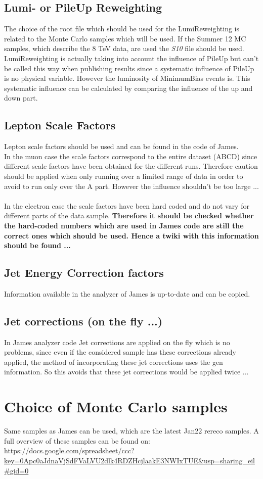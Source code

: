\documentclass[a4paper,12pt]{report}
\begin{document}
\subsection{Lumi- or PileUp Reweighting}
The choice of the root file which should be used for the LumiReweighting is related to the Monte Carlo samples which will be used. If the Summer 12 MC samples, which describe the 8 TeV data, are used the \textit{S10} file should be used.\\
LumiReweighting is actually taking into account the influence of PileUp but can't be called this way when publishing results since a systematic influence of PileUp is no physical variable. However the luminosity of MinimumBias events is. This systematic influence can be calculated by comparing the influence of the up and down part.

\subsection{Lepton Scale Factors}
Lepton scale factors should be used and can be found in the code of James.\\
In the muon case the scale factors correspond to the entire dataset (ABCD) since different scale factors have been obtained for the different runs. Therefore caution should be applied when only running over a limited range of data in order to avoid to run only over the A part. However the influence shouldn't be too large ...\\
\\
In the electron case the scale factors have been hard coded and do not vary for different parts of the data sample. \textbf{Therefore it should be checked whether the hard-coded numbers which are used in James code are still the correct ones which should be used. Hence a twiki with this information should be found ...}

\subsection{Jet Energy Correction factors}
Information available in the analyzer of James is up-to-date and can be copied.


\subsection{Jet corrections (on the fly ...)}
In James analyzer code Jet corrections are applied on the fly which is no problems, since even if the considered sample has these corrections already applied, the method of incorporating these jet corrections uses the gen information. So this avoids that these jet corrections would be applied twice ...

\section{Choice of Monte Carlo samples}
Same samples as James can be used, which are the latest Jan22 rereco samples. A full overview of these samples can be found on:
\url{https://docs.google.com/spreadsheet/ccc?key=0Apc0aJdnaVjSdFVaLVU2dlk4RDZHcjlaakE3NWIxTUE&usp=sharing_eil#gid=0}

 
\end{document}

